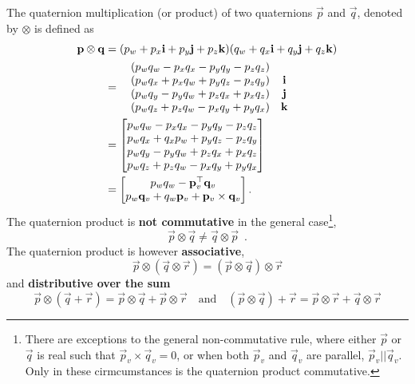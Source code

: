 The quaternion multiplication (or product) of two quaternions $\Vec{p}$ and
$\Vec{q}$, denoted by $\otimes$ is defined as
%
\begin{align}
  {\mathbf{p}} \otimes {\mathbf{q}}
    &=
    (p_w + p_x \mathbf{i} + p_y \mathbf{j} + p_z \mathbf{k})
    (q_w + q_x \mathbf{i} + q_y \mathbf{j} + q_z \mathbf{k}) \\
    &=
    \begin{matrix}
      &(p_w q_w - p_x q_x - p_y q_y - p_z q_z)& \\
      &(p_w q_x + p_x q_w + p_y q_z - p_z q_y)& \mathbf{i}\\
      &(p_w q_y - p_y q_w + p_z q_x + p_x q_z)& \mathbf{j}\\
      &(p_w q_z + p_z q_w - p_x q_y + p_y q_x)& \mathbf{k}\\
    \end{matrix} \\
    &=
    \begin{bmatrix}
      \label{eq:quaternion_product}
      p_w q_w - p_x q_x - p_y q_y - p_z q_z \\
      p_w q_x + q_x p_w + p_y q_z - p_z q_y \\
      p_w q_y - p_y q_w + p_z q_x + p_x q_z \\
      p_w q_z + p_z q_w - p_x q_y + p_y q_x \\
    \end{bmatrix} \\
    &=
    \begin{bmatrix}
      \label{eq:quaternion_product_2}
      p_w q_w - {{{\mathbf{p}}_{v}^{\top}}} {\mathbf{q}}_{v} \\
      p_w {\mathbf{q}}_{v} + q_w {\mathbf{p}}_{v} + {\mathbf{p}}_{v} \times {\mathbf{q}}_{v}
    \end{bmatrix}.
\end{align}
%
The quaternion product is \textbf{not commutative} in the general
case\footnote{There are exceptions to the general non-commutative rule, where
either $\Vec{p}$ or $\Vec{q}$ is real such that $\Vec{p}_{v} \times \Vec{q}_{v}
= 0$, or when both $\Vec{p}_v$ and $\Vec{q}_v$ are parallel, $\Vec{p}_v ||
\Vec{q}_v$. Only in these cirmcumstances is the quaternion product
commutative.},
%
\begin{equation}
  {\Vec{p} \otimes \Vec{q} \neq \Vec{q} \otimes \Vec{p}} \enspace .
\end{equation}
%
The quaternion product is however \textbf{associative},
%
\begin{equation}
  \Vec{p} \otimes (\Vec{q} \otimes \Vec{r})
  = (\Vec{p} \otimes \Vec{q}) \otimes \Vec{r}
\end{equation}
%
and \textbf{distributive over the sum}
%
\begin{equation}
  \Vec{p} \otimes (\Vec{q} + \Vec{r}) =
  \Vec{p} \otimes \Vec{q} + \Vec{p} \otimes \Vec{r}
  \quad \text{and} \quad
  (\Vec{p} \otimes \Vec{q}) + \Vec{r} =
  \Vec{p} \otimes \Vec{r} + \Vec{q} \otimes \Vec{r}
\end{equation}

